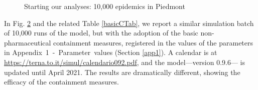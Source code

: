 \documentclass[graybox]{svmult}
\begin{document}
\begin{figure}[t]

 \begin{subfigure}{0.48\textwidth}
 \centering
 \label{10kNoControl}
 \end{subfigure}
 \hfill
 \begin{subfigure}{0.48\textwidth}
 \centering
 \label{10kBasicC}
 \end{subfigure}
 \caption{Starting our analyses: 10,000 epidemics in Piedmont}
 \label{withoutWithFig}
\end{figure}


In Fig. \ref{10kBasicC} and the related Table \ref{basicCTab}, we report a similar simulation batch of 10,000 runs of the model, but with the adoption of the basic non-pharmaceutical containment measures, registered in the values of the parameters in Appendix~1~-~Parameter~values (Section \ref{app1}). A calendar is at \href{https://terna.to.it/simul/calendario092.pdf}{https://terna.to.it/simul/calendario092.pdf}, and the model---version 0.9.6--- is updated until April 2021. The results are dramatically different, showing the efficacy of the containment measures. 
\end{document}
